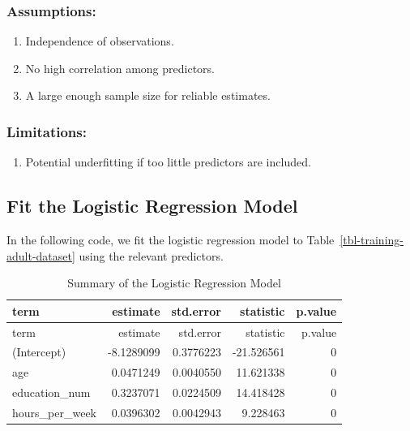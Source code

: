 \documentclass[
  letterpaper,
  DIV=11,
  numbers=noendperiod]{scrartcl}
\providecommand{\tightlist}{%
  \setlength{\itemsep}{0pt}\setlength{\parskip}{0pt}}\usepackage{longtable,booktabs,array}
\begin{document}
\hypertarget{assumptions}{%
\subsubsection{Assumptions:}\label{assumptions}}

\begin{enumerate}
\def\labelenumi{\arabic{enumi}.}
\tightlist
\item
  Independence of observations.
\item
  No high correlation among predictors.
\item
  A large enough sample size for reliable estimates.
\end{enumerate}

\hypertarget{limitations}{%
\subsubsection{Limitations:}\label{limitations}}

\begin{enumerate}
\def\labelenumi{\arabic{enumi}.}
\tightlist
\item
  Potential underfitting if too little predictors are included.
\end{enumerate}

\hypertarget{fit-the-logistic-regression-model}{%
\subsection{Fit the Logistic Regression
Model}\label{fit-the-logistic-regression-model}}

In the following code, we fit the logistic regression model to
Table~\ref{tbl-training-adult-dataset} using the relevant predictors.

\hypertarget{tbl-logreg-summary}{}
\begin{longtable}[]{@{}lrrrr@{}}
\caption{\label{tbl-logreg-summary}Summary of the Logistic Regression
Model}\tabularnewline
\toprule\noalign{}
term & estimate & std.error & statistic & p.value \\
\midrule\noalign{}
\endfirsthead
\toprule\noalign{}
term & estimate & std.error & statistic & p.value \\
\midrule\noalign{}
\endhead
\bottomrule\noalign{}
\endlastfoot
(Intercept) & -8.1289099 & 0.3776223 & -21.526561 & 0 \\
age & 0.0471249 & 0.0040550 & 11.621338 & 0 \\
education\_num & 0.3237071 & 0.0224509 & 14.418428 & 0 \\
hours\_per\_week & 0.0396302 & 0.0042943 & 9.228463 & 0 \\
\end{longtable}
\end{document}
